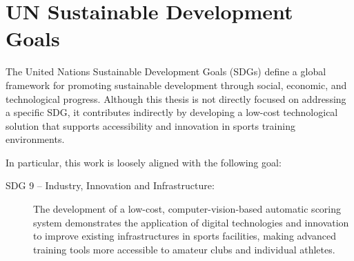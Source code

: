 
\chapter*{UN Sustainable Development Goals}
\label{chap:UnitedNations}

The United Nations Sustainable Development Goals (SDGs) define a global framework for promoting
sustainable development through social, economic, and technological progress. Although this
thesis is not directly focused on addressing a specific SDG, it contributes indirectly by
developing a low-cost technological solution that supports accessibility and innovation in
sports training environments.

In particular, this work is loosely aligned with the following goal:

\begin{description}
\item[SDG 9 -- Industry, Innovation and Infrastructure:]
The development of a low-cost, computer-vision-based automatic scoring system demonstrates the
application of digital technologies and innovation to improve existing infrastructures in
sports facilities, making advanced training tools more accessible to amateur clubs and
individual athletes.
\end{description}
